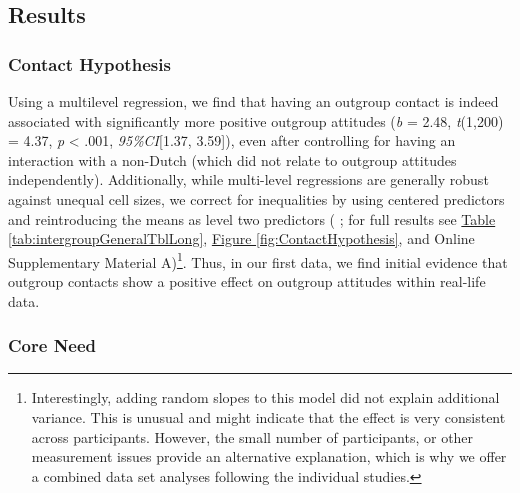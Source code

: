 \documentclass[man, 12pt, a4paper, mask]{apa7}
\theoremstyle{break}
\theoremstyle{plain}
\newcommand{\fgrref}[2][]{\hyperref[#2]{Figure \ref*{#2}#1}}
\newcommand{\tblref}[2][]{\hyperref[#2]{Table \ref*{#2}#1}}
\providecommand{\DIFaddbegin}{} %
\providecommand{\DIFaddend}{} %
\providecommand{\DIFdelbegin}{} %
\providecommand{\DIFdelend}{} %
\newcommand{\DIFscaledelfig}{0.5}
\newlength{\DIFdelgraphicswidth} %
\newlength{\DIFdelgraphicsheight} %
\newcommand{\DIFaddincludegraphics}[2][]{{\color{blue}\fbox{\DIFOincludegraphics[#1]{#2}}}} %
\newcommand{\DIFdelincludegraphics}[2][]{%
\sbox{\DIFdelgraphicsbox}{\DIFOincludegraphics[#1]{#2}}%
\settoboxwidth{\DIFdelgraphicswidth}{\DIFdelgraphicsbox} %
\settoboxtotalheight{\DIFdelgraphicsheight}{\DIFdelgraphicsbox} %
\scalebox{\DIFscaledelfig}{%
\parbox[b]{\DIFdelgraphicswidth}{\usebox{\DIFdelgraphicsbox}\\[-\baselineskip] \rule{\DIFdelgraphicswidth}{0em}}\llap{\resizebox{\DIFdelgraphicswidth}{\DIFdelgraphicsheight}{%
\setlength{\unitlength}{\DIFdelgraphicswidth}%
\begin{picture}(1,1)%
\thicklines\linethickness{2pt} %
{\color[rgb]{1,0,0}\put(0,0){\framebox(1,1){}}}%
{\color[rgb]{1,0,0}\put(0,0){\line( 1,1){1}}}%
{\color[rgb]{1,0,0}\put(0,1){\line(1,-1){1}}}%
\end{picture}%
}\hspace*{3pt}}} %
} %
\DeclareRobustCommand{\DIFaddbegin}{\DIFOaddbegin \let\includegraphics\DIFaddincludegraphics} %
\DeclareRobustCommand{\DIFaddend}{\DIFOaddend \let\includegraphics\DIFOincludegraphics} %
\DeclareRobustCommand{\DIFdelbegin}{\DIFOdelbegin \let\includegraphics\DIFdelincludegraphics} %
\DeclareRobustCommand{\DIFdelend}{\DIFOaddend \let\includegraphics\DIFOincludegraphics} %
\begin{document}
\subsection{Results}

\subsubsection{Contact Hypothesis}

Using a multilevel regression, we find that having an outgroup contact
is indeed associated with significantly more positive outgroup attitudes
(\textit{b} = 2.48, \textit{t}(1,200) = 4.37, \textit{p} \textless{}
.001, \textit{95\%CI}{[}1.37, 3.59{]}), even after controlling for
having an interaction with a non-Dutch (which did not relate to outgroup
attitudes independently). Additionally, while multi-level regressions
are generally robust against unequal cell sizes, we correct for
inequalities by using centered predictors and reintroducing the means as
level two predictors (\DIFdelbegin %
\DIFdelend \DIFaddbegin \citealp{yaremych2021a}\DIFaddend ; for full results see
\tblref{tab:intergroupGeneralTblLong}, \fgrref{fig:ContactHypothesis},
and Online Supplementary Material
A)\footnote{Interestingly, adding random slopes to this model did not explain additional variance. This is unusual and might indicate that the effect is very consistent across participants. However, the small number of participants, or other measurement issues provide an alternative explanation, which is why we offer a combined data set analyses following the individual studies.}.
Thus, in our first data, we find initial evidence that outgroup contacts
show a positive effect on outgroup attitudes within real-life data.

\subsubsection{Core Need}
\end{document}
